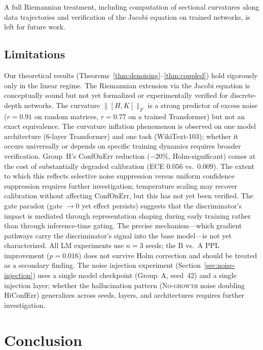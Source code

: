 \documentclass[11pt,a4paper]{article}
\theoremstyle{definition}
\begin{document}
A full Riemannian treatment, including computation of sectional
curvatures along data trajectories and verification of the Jacobi
equation on trained networks, is left for future work.

\subsection{Limitations}

Our theoretical results (Theorems~\ref{thm:denoising}--\ref{thm:coupled})
hold rigorously only in the linear regime. The Riemannian extension
via the Jacobi equation is conceptually sound but not yet formalized
or experimentally verified for discrete-depth networks.
The curvature $\|[H,K]\|_F$ is a strong predictor of excess noise
($r = 0.91$ on random matrices, $r = 0.77$ on a trained Transformer)
but not an exact equivalence.
The curvature inflation phenomenon is observed on one model
architecture (6-layer Transformer) and one task (WikiText-103);
whether it occurs universally or depends on specific training
dynamics requires broader verification.
Group~H's ConfOnErr reduction ($-20\%$, Holm-significant) comes
at the cost of substantially degraded calibration (ECE $0.056$
vs.\ $0.009$). The extent to which this reflects selective noise
suppression versus uniform confidence suppression requires further
investigation; temperature scaling may recover calibration without
affecting ConfOnErr, but this has not yet been verified.
The gate paradox (gate $\to 0$ yet effect persists) suggests that
the discriminator's impact is mediated through representation
shaping during early training rather than through inference-time
gating. The precise mechanism---which gradient pathways carry
the discriminator's signal into the base model---is not yet
characterized.
All LM experiments use $n = 3$ seeds; the B vs.\ A PPL
improvement ($p = 0.016$) does not survive Holm correction and
should be treated as a secondary finding.
The noise injection experiment (Section~\ref{sec:noise-injection})
uses a single model checkpoint (Group~A, seed~42) and a single
injection layer; whether the hallucination pattern
(\textsc{No-growth} noise doubling HiConfErr) generalizes across
seeds, layers, and architectures requires further investigation.

\section{Conclusion}
\label{sec:conclusion}
\end{document}
